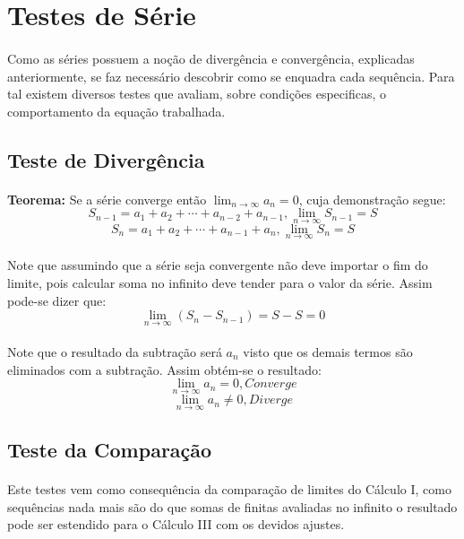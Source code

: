 \documentclass{article}
\begin{document}
\section{Testes de Série}
    \paragraph{}Como as séries possuem a noção de divergência e convergência, explicadas anteriormente, se faz necessário descobrir como se enquadra cada sequência. Para tal existem diversos testes que avaliam, sobre condições especificas, o comportamento da equação trabalhada.
    
    \subsection{Teste de Divergência}
        \paragraph{}\textbf{Teorema:} Se a série converge então $\lim_{n\to\infty}a_{n} = 0$, cuja demonstração segue:
            \[S_{n-1}=a_{1}+a_{2}+\cdots+a_{n-2}+a_{n-1}, \lim_{n\to\infty}S_{n-1} = S\]
            \[S_{n}=a_{1}+a_{2}+\cdots+a_{n-1}+a_{n}, \lim_{n\to\infty}S_{n} = S\]
        \paragraph{}Note que assumindo que a série seja convergente não deve importar o fim do limite, pois calcular soma no infinito deve tender para o valor da série. Assim pode-se dizer que:
            \[\lim_{n\to\infty}(S_{n}-S_{n-1}) = S - S = 0\]
        \paragraph{}Note que o resultado da subtração será $a_{n}$ visto que os demais termos são eliminados com a subtração. Assim obtém-se o resultado:
            \[\lim_{n\to\infty}a_{n} = 0, Converge\]
            \[\lim_{n\to\infty}a_{n} \ne 0, Diverge\]
    
    \subsection{Teste da Comparação}
        \paragraph{}Este testes vem como consequência da comparação de limites do Cálculo I, como sequências nada mais são do que somas de finitas avaliadas no infinito o resultado pode ser estendido para o Cálculo III com os devidos ajustes.
\end{document}
